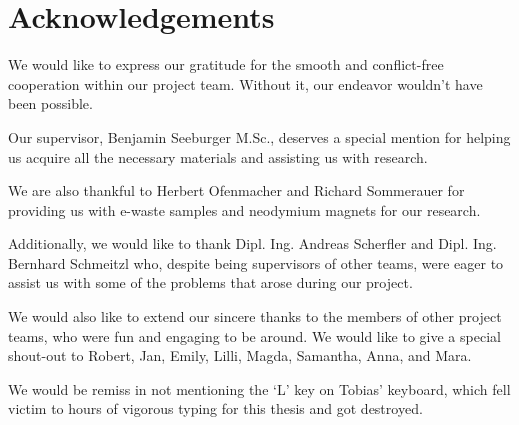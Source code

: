 \chapter*{Acknowledgements}

We would like to express our gratitude for the smooth and conflict-free cooperation within our
project team.
Without it, our endeavor wouldn't have been possible.

Our supervisor, Benjamin
Seeburger M.Sc., deserves a special mention for helping us acquire all the necessary materials and
assisting us with research.

We are also thankful to Herbert Ofenmacher and Richard Sommerauer for
providing us with e-waste samples and neodymium magnets for our research.

Additionally, we would
like to thank Dipl. Ing. Andreas Scherfler and Dipl. Ing. Bernhard Schmeitzl who, despite being
supervisors of other teams, were eager to assist us with some of the problems that arose during our
project.

We would also like to extend our sincere thanks to the members of other project teams, who
were fun and engaging to be around. We would like to give a special shout-out to Robert, Jan, Emily,
Lilli, Magda, Samantha, Anna, and Mara.

We would be remiss in not mentioning the `L' key on Tobias'
keyboard, which fell victim to hours of vigorous typing for this thesis and got destroyed.
